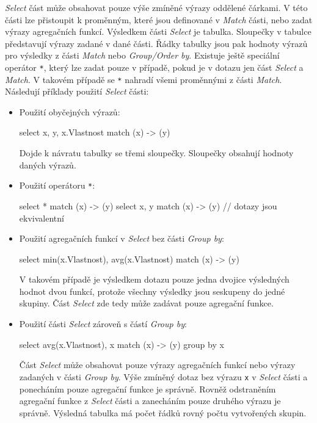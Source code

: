 \textit{Select} část může obsahovat pouze výše zmíněné výrazy oddělené čárkami.
V této části lze přistoupit k proměnným, které jsou definované v \textit{Match} části, nebo zadat výrazy agregačních funkcí.
Výsledkem části \textit{Select} je tabulka.
Sloupečky v tabulce představují výrazy zadané v dané části.
Řádky tabulky jsou pak hodnoty výrazů pro výsledky z části \textit{Match} nebo \textit{Group/Order by}.
Existuje ještě speciální operátor \texttt{*}, který lze zadat pouze v případě, pokud je v dotazu jen část \textit{Select} a \textit{Match}.
V takovém případě se \texttt{*} nahradí všemi proměnnými z části \textit{Match}.
Následují příklady použití \textit{Select} části:
\begin{itemize}
\item
Použití obyčejných výrazů:
\begin{code}
select x, y, x.Vlastnost match (x) -> (y)
\end{code}
Dojde k návratu tabulky se třemi sloupečky.
Sloupečky obsahují hodnoty daných výrazů.

\item
Použití operátoru \texttt{*}:
\begin{code}
select * match (x) -> (y)
select x, y match (x) -> (y) 
// dotazy jsou ekvivalentní
\end{code} 

\item
Použití agregačních funkcí v \textit{Select} bez části \textit{Group by}:
\begin{code}
select min(x.Vlastnost), avg(x.Vlastnost) match (x) -> (y)
\end{code}
V takovém případě je výsledkem dotazu pouze jedna dvojice výsledných hodnot dvou funkcí, protože všechny výsledky jsou seskupeny do jedné skupiny.
Část \textit{Select} zde tedy může zadávat pouze agregační funkce.

\item
Použití části \textit{Select} zároveň s částí \textit{Group by}:
\begin{code}
select avg(x.Vlastnost), x match (x) -> (y) group by x
\end{code}
Část \textit{Select} může obsahovat pouze výrazy agregačních funkcí nebo výrazy zadaných v části \textit{Group by}.
Výše zmíněný dotaz bez výrazu \texttt{x} v \textit{Select} části a ponecháním pouze agregační funkce je správně.
Rovněž odstraněním agregační funkce z \textit{Select} části a zanecháním pouze druhého výrazu je správně.
Výsledná tabulka má počet řádků rovný počtu vytvořených skupin.
\end{itemize}

